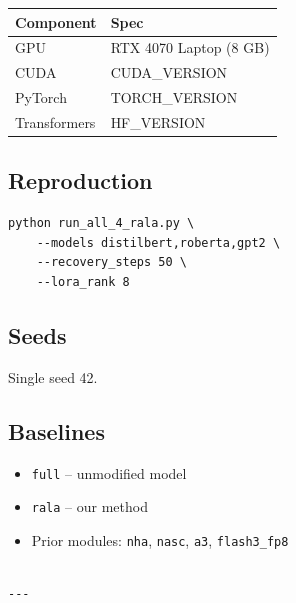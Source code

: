 \begin{table}[H]
\centering
\small
\begin{tabular}{ll}
\toprule
\textbf{Component} & \textbf{Spec} \\
\midrule
GPU & RTX 4070 Laptop (8 GB) \\
CUDA & {{CUDA\_VERSION}} \\
PyTorch & {{TORCH\_VERSION}} \\
Transformers & {{HF\_VERSION}} \\
\bottomrule
\end{tabular}
\end{table}

\subsection{Reproduction}

\begin{lstlisting}
python run_all_4_rala.py \
    --models distilbert,roberta,gpt2 \
    --recovery_steps 50 \
    --lora_rank 8
\end{lstlisting}

\subsection{Seeds}

Single seed 42.

\subsection{Baselines}

\begin{itemize}
\item \texttt{full} -- unmodified model
\item \texttt{rala} -- our method
\item Prior modules: \texttt{nha}, \texttt{nasc}, \texttt{a3}, \texttt{flash3\_fp8}
\end{itemize}
\begin{lstlisting}

---
\end{lstlisting}